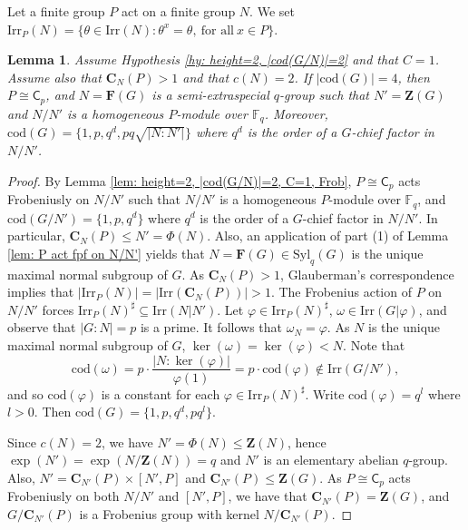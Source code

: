 \documentclass[9pt]{article}
\newtheorem{lem}{\bf Lemma}[section]
\begin{document}
Let a finite group $P$ act on a finite group $N$.
We set $\mathrm{Irr}_P(N)=\{ \theta\in \mathrm{Irr}(N):\theta^x=\theta,~\text{for all}~x\in P \}$.



\begin{lem}\label{lem: height=2, |cod(G/N)|=2, C=1, not Frob, cN=2}
	Assume Hypothesis \ref{hy: height=2, |cod(G/N)|=2} and that $C=1$.
    Assume also that $\mathbf{C}_{N}(P)>1$ and that $c(N)=2$.
    If $|\mathrm{cod}(G)|=4$,
	then $P\cong \mathsf{C}_{p}$, and $N=\mathbf{F}(G)$ is a semi-extraspecial $q$-group such that $N'=\mathbf{Z}(G)$ and $N/N'$ is a homogeneous $P$-module over $\mathbb{F}_q$.
	Moreover, $\mathrm{cod}(G)=\{ 1,p,q^{d}, pq \sqrt{|N:N'|} \}$ where 
	$q^{d}$ is the order of a $G$-chief factor in $N/N'$.   
\end{lem}
\begin{proof}
	By Lemma \ref{lem: height=2, |cod(G/N)|=2, C=1, Frob},
	$P\cong \mathsf{C}_{p}$ acts Frobeniusly on $N/N'$ such that $N/N'$ is a homogeneous $P$-module over $\mathbb{F}_q$, and $\mathrm{cod}(G/N')=\{ 1,p,q^{d} \}$ where $q^{d}$ is the 
	order of a $G$-chief factor in $N/N'$.
	In particular, $\mathbf{C}_{N}(P)\leq N'=\Phi(N)$.
    Also, an application of part (1) of Lemma \ref{lem: P act fpf on N/N'} yields that $N=\mathbf{F}(G)\in \mathrm{Syl}_{q}(G)$ is the unique
	maximal normal subgroup of $G$.
    As $\mathbf{C}_{N}(P)>1$, Glauberman's correspondence \cite[Theorem 13.1]{isaacs1994} implies that $|\mathrm{Irr}_P(N)|=|\mathrm{Irr}(\mathbf{C}_{N}(P))|>1$.
	The Frobenius action of $P$ on $N/N'$ forces $\mathrm{Irr}_P(N)^\sharp \subseteq \mathrm{Irr}(N|N')$.
    Let $\varphi\in \mathrm{Irr}_P(N)^\sharp$, $\omega\in \mathrm{Irr}(G|\varphi)$, and observe that $|G:N|=p$ is a prime.
    It follows that $\omega_N=\varphi$.
	As $N$ is the unique maximal normal subgroup of $G$,
	$\ker(\omega)=\ker(\varphi)<N$.
    Note that 
	$$\mathrm{cod}(\omega)=p\cdot \frac{|N:\ker(\varphi)|}{\varphi(1)}=p\cdot \mathrm{cod}(\varphi)\notin \mathrm{Irr}(G/N'),$$
	and so $\mathrm{cod}(\varphi)$ is a constant for each $\varphi \in \mathrm{Irr}_P(N)^\sharp$.
    Write $\mathrm{cod}(\varphi)=q^{l}$ where $l>0$.
    Then $\mathrm{cod}(G)=\{ 1,p,q^{d},pq^{l} \}$.



   



    Since $c(N)=2$,
	we have $N'=\Phi(N)\leq \mathbf{Z}(N)$,
	hence $\exp(N')=\exp (N/\mathbf{Z}(N))=q$ and $N'$ is an elementary abelian $q$-group. 
	Also, $N'=\mathbf{C}_{N'}(P)\times [N',P]$ and $\mathbf{C}_{N'}(P)\leq\mathbf{Z}(G)$.
	As $P\cong \mathsf{C}_{p}$ acts Frobeniusly on both $N/N'$ and $[N',P]$,
	we have that $\mathbf{C}_{N'}(P)=\mathbf{Z}(G)$,
	and $G/\mathbf{C}_{N'}(P)$ is a Frobenius group with kernel $N/\mathbf{C}_{N'}(P)$.



\end{proof}
\end{document}
